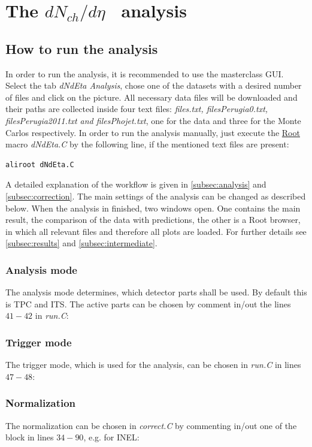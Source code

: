 \documentclass{article}
\newcommand\dNdEta{$dN_{ch}/d\eta$}
\begin{document}
\section{The \dNdEta~ analysis}

\subsection{How to run the analysis}
In order to run the analysis, it is recommended to use the masterclass GUI. Select the tab \textit{dNdEta Analysis}, chose one of the datasets with a desired number of files and click on the picture. All necessary data files will be downloaded and their paths are collected inside four text files: \textit{files.txt, filesPerugia0.txt, filesPerugia2011.txt and filesPhojet.txt}, one for the data and three for the Monte Carlos respectively. In order to run the analysis manually, just execute the \href{https://root.cern.ch/}{Root} macro \textit{dNdEta.C} by the following line, if the mentioned text files are present:
\begin{lstlisting}[numbers=none, language=bash]
aliroot dNdEta.C
\end{lstlisting}
A detailed explanation of the workflow is given in \ref{subsec:analysis} and \ref{subsec:correction}. The main settings of the analysis can be changed as described below. When the analysis in finished, two windows open. One contains the main result, the comparison of the data with predictions, the other is a Root browser, in which all relevant files and therefore all plots are loaded. For further details see \ref{subsec:results} and \ref{subsec:intermediate}.
\subsubsection*{Analysis mode}
The analysis mode determines, which detector parts shall be used. By default this is TPC and ITS. The active parts can be chosen by comment in/out the lines $41-42$ in \textit{run.C}:

\subsubsection*{Trigger mode}
The trigger mode, which is used for the analysis, can be chosen in \textit{run.C} in lines $47-48$:

\subsubsection*{Normalization}
The normalization can be chosen in \textit{correct.C} by commenting in/out one of the block in lines $34-90$, e.g. for INEL:

\end{document}
